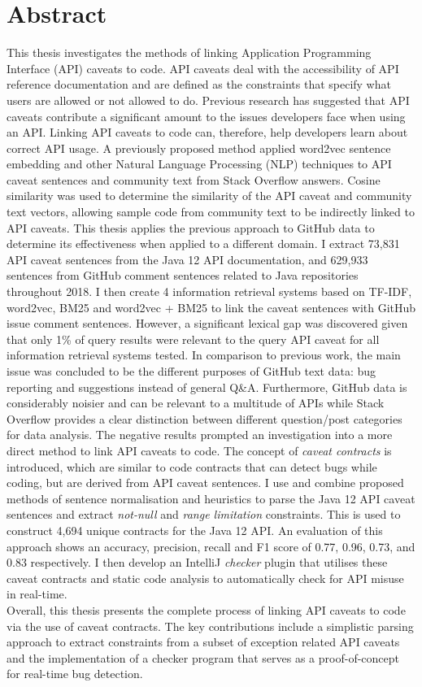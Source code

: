 \chapter*{Abstract}
\vspace{-1em}
This thesis investigates the methods of linking Application Programming Interface (API) caveats to code. API caveats deal with the accessibility of API reference documentation and are defined as the constraints that specify what users are allowed or not allowed to do. Previous research has suggested that API caveats contribute a significant amount to the issues developers face when using an API. Linking API caveats to code can, therefore, help developers learn about correct API usage. A previously proposed method applied word2vec sentence embedding and other Natural Language Processing (NLP) techniques to API caveat sentences and community text from Stack Overflow answers. Cosine similarity was used to determine the similarity of the API caveat and community text vectors, allowing sample code from community text to be indirectly linked to API caveats. This thesis applies the previous approach to GitHub data to determine its effectiveness when applied to a different domain. I extract 73,831 API caveat sentences from the Java 12 API documentation, and 629,933 sentences from GitHub comment sentences related to Java repositories throughout 2018. I then create 4 information retrieval systems based on TF-IDF, word2vec, BM25 and word2vec + BM25 to link the caveat sentences with GitHub issue comment sentences. However, a significant lexical gap was discovered given that only 1\% of query results were relevant to the query API caveat for all information retrieval systems tested. In comparison to previous work, the main issue was concluded to be the different purposes of GitHub text data: bug reporting and suggestions instead of general Q\&A. Furthermore, GitHub data is considerably noisier and can be relevant to a multitude of APIs while Stack Overflow provides a clear distinction between different question/post categories for data analysis. The negative results prompted an investigation into a more direct method to link API caveats to code. The concept of \textit{caveat contracts} is introduced, which are similar to code contracts that can detect bugs while coding, but are derived from API caveat sentences. I use and combine proposed methods of sentence normalisation and heuristics to parse the Java 12 API caveat sentences and extract \textit{not-null} and \textit{range limitation} constraints. This is used to construct 4,694 unique contracts for the Java 12 API. An evaluation of this approach shows an accuracy, precision, recall and F1 score of 0.77, 0.96, 0.73, and 0.83 respectively. I then develop an IntelliJ \textit{checker} plugin that utilises these caveat contracts and static code analysis to automatically check for API misuse in real-time. \\
Overall, this thesis presents the complete process of linking API caveats to code via the use of caveat contracts. The key contributions include a simplistic parsing approach to extract constraints from a subset of exception related API caveats and the implementation of a checker program that serves as a proof-of-concept for real-time bug detection.